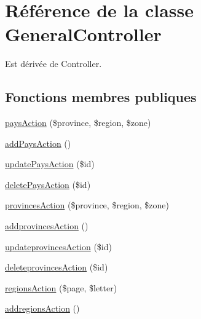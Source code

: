 \hypertarget{class_my_app_1_1_admin_bundle_1_1_controller_1_1_general_controller}{\section{Référence de la classe General\-Controller}
\label{class_my_app_1_1_admin_bundle_1_1_controller_1_1_general_controller}
}


Est dérivée de Controller.

\subsection*{Fonctions membres publiques}
\begin{DoxyCompactItemize}
\item 
\hyperlink{class_my_app_1_1_admin_bundle_1_1_controller_1_1_general_controller_a094ee723a9176e7303c3b72b35c452a1}{pays\-Action} (\$province, \$region, \$zone)
\item 
\hyperlink{class_my_app_1_1_admin_bundle_1_1_controller_1_1_general_controller_a1b063e9e8cdb7d20726e077a96871a4d}{add\-Pays\-Action} ()
\item 
\hyperlink{class_my_app_1_1_admin_bundle_1_1_controller_1_1_general_controller_ae0a23d97ec0c0e21ca4802fd473c2a5a}{update\-Pays\-Action} (\$id)
\item 
\hyperlink{class_my_app_1_1_admin_bundle_1_1_controller_1_1_general_controller_a4d7eb73d38c2914dc33bcbf848466ef0}{delete\-Pays\-Action} (\$id)
\item 
\hyperlink{class_my_app_1_1_admin_bundle_1_1_controller_1_1_general_controller_a459e0ab42ac8e82cac1236dfdc7fb03b}{provinces\-Action} (\$province, \$region, \$zone)
\item 
\hyperlink{class_my_app_1_1_admin_bundle_1_1_controller_1_1_general_controller_a57887e2d0a1733af77fd498aec353e0e}{addprovinces\-Action} ()
\item 
\hyperlink{class_my_app_1_1_admin_bundle_1_1_controller_1_1_general_controller_ac86b7808cbe9e16bb247198aff018e58}{updateprovinces\-Action} (\$id)
\item 
\hyperlink{class_my_app_1_1_admin_bundle_1_1_controller_1_1_general_controller_aaaafdfaf62d363b3d8b95ba333274a8f}{deleteprovinces\-Action} (\$id)
\item 
\hyperlink{class_my_app_1_1_admin_bundle_1_1_controller_1_1_general_controller_af9e783855816dd1e8ffd5be2a4ce137b}{regions\-Action} (\$page, \$letter)
\item 
\hyperlink{class_my_app_1_1_admin_bundle_1_1_controller_1_1_general_controller_a9fe65c75dcf2c608a14beb9c7bfce38f}{addregions\-Action} ()

\end{DoxyCompactItemize}
